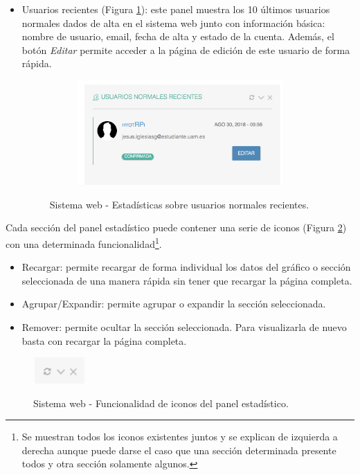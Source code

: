 \documentclass[12pt,a4paper, twoside]{report}
\begin{document}
\begin{itemize}
		\item Usuarios recientes (Figura \ref{fig:web_UsuariosRecientes}): este panel muestra los 10 últimos usuarios normales dados de alta en el sistema web junto con información básica: nombre de usuario, email, fecha de alta y estado de la cuenta. Además, el botón \textit{Editar} permite acceder a la página de edición de este usuario de forma rápida.

		\begin{figure}[!ht]   
			\caption{Sistema web - Estadísticas sobre usuarios normales recientes.} 
			\begin{center}
		 		\includegraphics[width=10cm, height=4cm]{Images/userGuide/web/esUsuariosRecientes} \\
				\label{fig:web_UsuariosRecientes} 
			\end{center}  	
		\end{figure}
		
	\end{itemize}
		
	Cada sección del panel estadístico puede contener una serie de iconos (Figura \ref{fig:web_botonesFuncionalidad}) con una determinada funcionalidad\footnote{Se muestran todos los iconos existentes juntos y se explican de izquierda a derecha aunque puede darse el caso que una sección determinada presente todos y otra sección solamente algunos.}.
	
	\begin{itemize}
		\item Recargar: permite recargar de forma individual los datos del gráfico o sección seleccionada de una manera rápida sin tener que recargar la página completa.
		\item Agrupar/Expandir: permite agrupar o expandir la sección seleccionada.
		\item Remover: permite ocultar la sección seleccionada. Para visualizarla de nuevo basta con recargar la página completa.
	\end{itemize}
		
		\begin{figure}[!ht]   
			\caption{Sistema web - Funcionalidad de iconos del panel estadístico.} 
			\begin{center}
		 		\includegraphics[width=2cm, height=1cm]{Images/userGuide/web/botonesFuncionalidad} \\
				\label{fig:web_botonesFuncionalidad} 
			\end{center}  	
		\end{figure}
			
\end{document}
